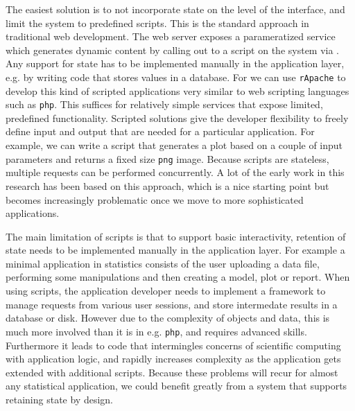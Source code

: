 The easiest solution is to not incorporate state on the level of the interface, and limit the system to predefined scripts. This is the standard approach in traditional web development. The web server exposes a parameratized service which generates dynamic content by calling out to a script on the system via \CGI. Any support for state has to be implemented manually in the application layer, e.g. by writing code that stores values in a database. For \R we can use \texttt{rApache} \citep{horner2013rapache} to develop this kind of scripted applications very similar to web scripting languages such as \texttt{php}. This suffices for relatively simple services that expose limited, predefined functionality. Scripted solutions give the developer flexibility to freely define input and output that are needed for a particular application. For example, we can write a script that generates a plot based on a couple of input parameters and returns a fixed size \texttt{png} image. Because scripts are stateless, multiple requests can be performed concurrently. A lot of the early work in this research has been based on this approach, which is a nice starting point but becomes increasingly problematic once we move to more sophisticated applications.

The main limitation of scripts is that to support basic interactivity, retention of state needs to be implemented manually in the application layer. For example a minimal application in statistics consists of the user uploading a data file, performing some manipulations and then creating a model, plot or report. When using scripts, the application developer needs to implement a framework to manage requests from various user sessions, and store intermedate results in a database or disk. However due to the complexity of objects and data, this is much more involved than it is in e.g. \texttt{php}, and requires advanced \R skills. Furthermore it leads to code that intermingles concerns of scientific computing with application logic, and rapidly increases complexity as the application gets extended with additional scripts.
Because these problems will recur for almost any statistical application, we could benefit greatly from a system that supports retaining state by design.

